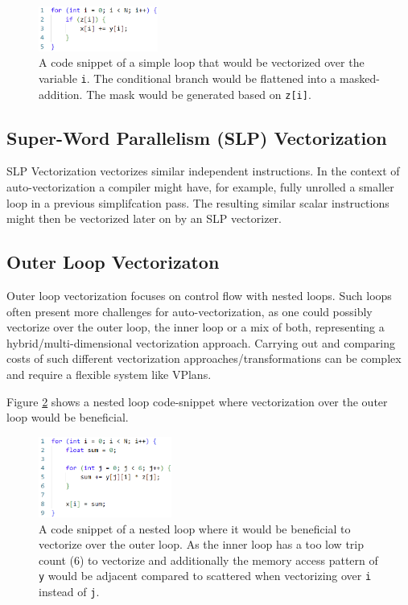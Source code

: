 \documentclass[sigplan,11pt,nonacm]{acmart}
\begin{document}
\begin{figure}
  \centering
  \includegraphics[width=0.35\textwidth]{images/inner-loop-vec.png}
  \caption{A code snippet of a simple loop that would be vectorized over the variable \texttt{i}. 
  The conditional branch would be flattened into a masked-addition. The mask would be generated 
  based on \texttt{z[i]}.}
  \label{fig:inner-loop-vec}
\end{figure}

\subsection{Super-Word Parallelism (SLP) Vectorization}
SLP Vectorization vectorizes similar independent instructions. In the context of auto-vectorization a 
compiler might have, for example, fully unrolled a smaller loop in a previous simplifcation pass. 
The resulting similar scalar instructions might then be vectorized later on by an SLP vectorizer.

\subsection{Outer Loop Vectorizaton}
Outer loop vectorization focuses on control flow with nested loops. Such loops often present
more challenges for auto-vectorization, as one could possibly vectorize over the outer loop,
the inner loop or a mix of both, representing a hybrid/multi-dimensional vectorization approach. Carrying out and
comparing costs of such different vectorization approaches/transformations can be complex and
require a flexible system like VPlans. 

Figure \ref{fig:outer-loop-vec} shows a nested loop code-snippet where vectorization over the
outer loop would be beneficial.

\begin{figure}
  \centering
  \includegraphics[width=0.39\textwidth]{images/outer-loop-vec.png}
  \caption{A code snippet of a nested loop where it would be beneficial to vectorize over the 
  outer loop. As the inner loop has a too low trip count (6) to vectorize and additionally
  the memory access pattern of \texttt{y} would be adjacent compared to scattered when
  vectorizing over \texttt{i} instead of \texttt{j}.}
  \label{fig:outer-loop-vec}
\end{figure}
\end{document}
